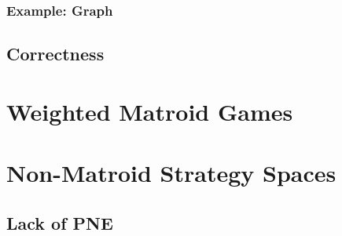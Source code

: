 \documentclass{beamer}
\begin{document}
\begin{frame}
  \frametitle{Example: Graph}
  \resizebox{\textwidth}{!}{}
\end{frame}

\subsection{Correctness}
\begin{frame}
\end{frame}

\section{Weighted Matroid Games}
\begin{frame}
\end{frame}

\section{Non-Matroid Strategy Spaces}
\subsection{Lack of PNE}
\begin{frame}
\end{frame}
\end{document}
